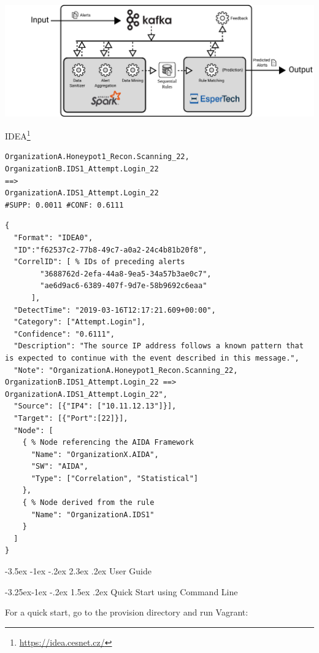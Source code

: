 \documentclass[a4paper]{article} %
\makeatletter
\renewcommand\section{\@startsection {section}{1}{\z@}%
                   {-3.5ex \@plus -1ex \@minus -.2ex}%
                   {2.3ex \@plus.2ex}%
                   {\normalfont\sffamily\Large\bfseries\color{projectcolor}}}
\renewcommand\subsection{\@startsection{subsection}{2}{\z@}%
                   {-3.25ex\@plus -1ex \@minus -.2ex}%
                   {1.5ex \@plus .2ex}%
                   {\normalfont\sffamily\large\bfseries\color{projectcolor}}}
\makeatother
\begin{document}
\includegraphics[width=\textwidth]{fig/aida_schema}

IDEA\footnote{\url{https://idea.cesnet.cz/}}

\begin{lstlisting}[]
OrganizationA.Honeypot1_Recon.Scanning_22,
OrganizationB.IDS1_Attempt.Login_22
==>
OrganizationA.IDS1_Attempt.Login_22
#SUPP: 0.0011 #CONF: 0.6111
\end{lstlisting}

\begin{lstlisting}[]
{
  "Format": "IDEA0",
  "ID":"f62537c2-77b8-49c7-a0a2-24c4b81b20f8",
  "CorrelID": [ % IDs of preceding alerts
        "3688762d-2efa-44a8-9ea5-34a57b3ae0c7",
        "ae6d9ac6-6389-407f-9d7e-58b9692c6eaa"
      ],
  "DetectTime": "2019-03-16T12:17:21.609+00:00",
  "Category": ["Attempt.Login"],
  "Confidence": "0.6111",
  "Description": "The source IP address follows a known pattern that is expected to continue with the event described in this message.",
  "Note": "OrganizationA.Honeypot1_Recon.Scanning_22, OrganizationB.IDS1_Attempt.Login_22 ==> OrganizationA.IDS1_Attempt.Login_22",
  "Source": [{"IP4": ["10.11.12.13"]}],
  "Target": [{"Port":[22]}],
  "Node": [
    { % Node referencing the AIDA Framework
      "Name": "OrganizationX.AIDA",
      "SW": "AIDA",
      "Type": ["Correlation", "Statistical"]
    },
    { % Node derived from the rule
      "Name": "OrganizationA.IDS1"
    }
  ]
}
\end{lstlisting}

\cleardoublepage


\section{User Guide}

\subsection{Quick Start using Command Line}

For a quick start, go to the provision directory and run Vagrant:
\end{document}

